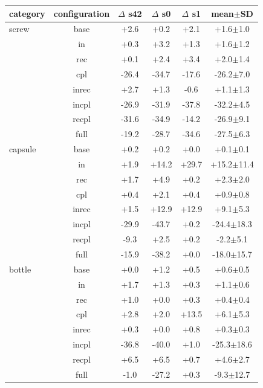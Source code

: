 \setlength{\tabcolsep}{3pt}
\begin{tabular}{@{}lccccc@{}}
\toprule
category & configuration & $\Delta$ s42 & $\Delta$ s0 & $\Delta$ s1 & mean$\pm$SD \\
\midrule
screw & base & +2.6 & +0.2 & +2.1 & +1.6$\pm$1.0 \\
 & in & +0.3 & +3.2 & +1.3 & +1.6$\pm$1.2 \\
 & rec & +0.1 & +2.4 & +3.4 & +2.0$\pm$1.4 \\
 & cpl & -26.4 & -34.7 & -17.6 & -26.2$\pm$7.0 \\
 & inrec & +2.7 & +1.3 & -0.6 & +1.1$\pm$1.3 \\
 & incpl & -26.9 & -31.9 & -37.8 & -32.2$\pm$4.5 \\
 & recpl & -31.6 & -34.9 & -14.2 & -26.9$\pm$9.1 \\
 & full & -19.2 & -28.7 & -34.6 & -27.5$\pm$6.3 \\
capsule & base & +0.2 & +0.2 & +0.0 & +0.1$\pm$0.1 \\
 & in & +1.9 & +14.2 & +29.7 & +15.2$\pm$11.4 \\
 & rec & +1.7 & +4.9 & +0.2 & +2.3$\pm$2.0 \\
 & cpl & +0.4 & +2.1 & +0.4 & +0.9$\pm$0.8 \\
 & inrec & +1.5 & +12.9 & +12.9 & +9.1$\pm$5.3 \\
 & incpl & -29.9 & -43.7 & +0.2 & -24.4$\pm$18.3 \\
 & recpl & -9.3 & +2.5 & +0.2 & -2.2$\pm$5.1 \\
 & full & -15.9 & -38.2 & +0.0 & -18.0$\pm$15.7 \\
bottle & base & +0.0 & +1.2 & +0.5 & +0.6$\pm$0.5 \\
 & in & +1.7 & +1.3 & +0.3 & +1.1$\pm$0.6 \\
 & rec & +1.0 & +0.0 & +0.3 & +0.4$\pm$0.4 \\
 & cpl & +2.8 & +2.0 & +13.5 & +6.1$\pm$5.3 \\
 & inrec & +0.3 & +0.0 & +0.8 & +0.3$\pm$0.3 \\
 & incpl & -36.8 & -40.0 & +1.0 & -25.3$\pm$18.6 \\
 & recpl & +6.5 & +6.5 & +0.7 & +4.6$\pm$2.7 \\
 & full & -1.0 & -27.2 & +0.3 & -9.3$\pm$12.7 \\
\bottomrule
\end{tabular}
